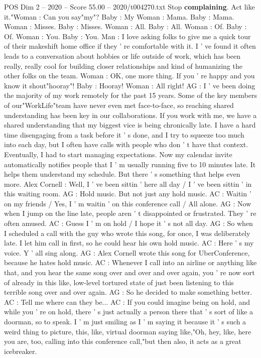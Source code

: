 \begin{textsample}{POS Dim 2 – 2020 – Score 55.00 – 2020/t004270.txt}
Stop \textbf{complaining}.
Act like it."Woman : Can you say"my"?
Baby : My Woman : Mama.
Baby : Mama.
Woman : Misses.
Baby : Misses.
Woman : All.
Baby : All.
Woman : Of.
Baby : Of.
Woman : You.
Baby : You.
Man : I love asking folks to give me a quick tour of their makeshift home office if they ' re comfortable with it.
I ' ve found it often leads to a conversation about hobbies or life outside of work, which has been really, really cool for building closer relationships and kind of humanizing the other folks on the team.
Woman : OK, one more thing.
If you ' re happy and you know it shout"hooray"!
Baby : Hooray!
Woman : All right!
AG : I ' ve been doing the majority of my work remotely for the past 15 years.
Some of the key members of our"WorkLife"team have never even met face-to-face, so reaching shared understanding has been key in our collaborations.
If you work with me, we have a shared understanding that my biggest vice is being chronically late.
I have a hard time disengaging from a task before it ' s done, and I try to squeeze too much into each day, but I often have calls with people who don ' t have that context.
Eventually, I had to start managing expectations.
Now my calendar invite automatically notifies people that I ' m usually running five to 10 minutes late.
It helps them understand my schedule.
But there ' s something that helps even more.
Alex Cornell : Well, I ' ve been sittin ' here all day / I ' ve been sittin ' in this waiting room.
AG : Hold music.
But not just any hold music.
AC : Waitin ' on my friends / Yes, I ' m waitin ' on this conference call / All alone.
AG : Now when I jump on the line late, people aren ' t disappointed or frustrated.
They ' re often amused.
AC : Guess I ' m on hold / I hope it ' s not all day.
AG : So when I scheduled a call with the guy who wrote this song, for once, I was deliberately late.
I let him call in first, so he could hear his own hold music.
AC : Here ' s my voice.
Y ' all sing along.
AG : Alex Cornell wrote this song for UberConference, because he hates hold music.
AC : Whenever I call into an airline or anything like that, and you hear the same song over and over and over again, you ' re now sort of already in this like, low-level tortured state of just been listening to this terrible song over and over again.
AG : So he decided to make something better.
AC : Tell me where can they be...
AC : If you could imagine being on hold, and while you ' re on hold, there ' s just actually a person there that ' s sort of like a doorman, so to speak.
I ' m just smiling as I ' m saying it because it ' s such a weird thing to picture, this, like, virtual doorman saying like,"Oh, hey, like, here you are, too, calling into this conference call,"but then also, it acts as a great icebreaker.

\end{textsample}

